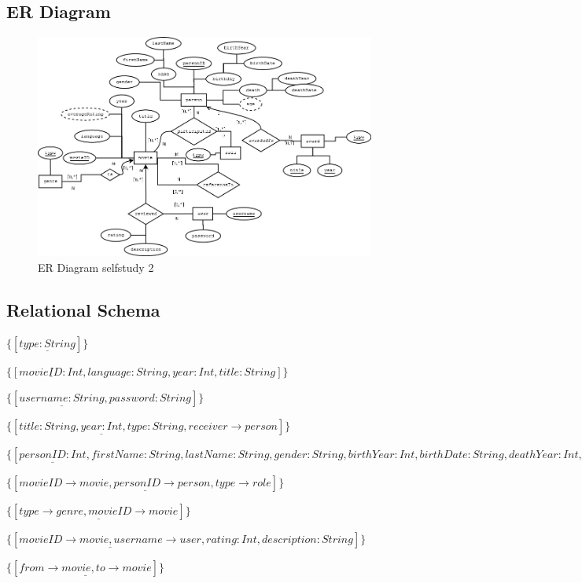 \documentclass[10pt,a4paper,final]{report}
\begin{document}
\subsection*{ER Diagram}
\begin{figure}[H]
     \includegraphics[scale=0.4]{ERdiagram.png}
     \caption{ER Diagram selfstudy 2}
\end{figure}
\subsection*{Relational Schema}
\begin{description}[style=nextline]
     \item[genre]
     $\{[\underline{type:String}]\}$
     \item[movie]
     $\{[\underline{movieID:Int},language:String,year:Int,title:String]\}$
     \item[user]
     $\{[\underline{username:String},password:String]\}$
     \item[award]
     $\{[\underline{title:String, year:Int, type:String}, receiver \rightarrow person]\}$
     \item[person]
     $\{[\underline{personID:Int},firstName:String, lastName:String, gender:String, birthYear:Int, birthDate:String, deathYear:Int, deathDate:String]\}$
     \item[participated]
     $\{[\underline{movieID\rightarrow movie, personID \rightarrow person, type \rightarrow role}]\}$
     \item[is]
     $\{[\underline{type \rightarrow genre, movieID \rightarrow movie}]\}$
     \item[reviewed]
     $\{[\underline{movieID \rightarrow movie, username \rightarrow user}, rating:Int, description:String]\}$
     \item[referenceTo]
     $\{[\underline{from \rightarrow movie, to \rightarrow movie}]\}$
\end{description}
\end{document}
